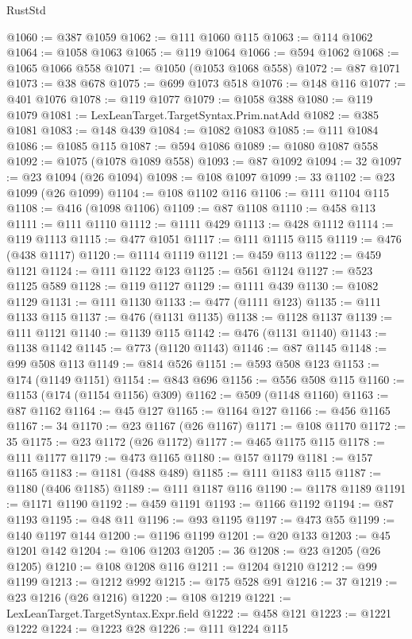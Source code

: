 \begin{lexlean}{RustStd}
\begin{coremodule}
@1060 := @387 @1059
@1062 := @111 @1060 @115
@1063 := @114 @1062
@1064 := @1058 @1063
@1065 := @119 @1064
@1066 := @594 @1062
@1068 := @1065 @1066 @558
@1071 := @1050 (@1053 @1068 @558)
@1072 := @87 @1071
@1073 := @38 @678
@1075 := @699 @1073 @518
@1076 := @148 @116
@1077 := @401 @1076
@1078 := @119 @1077
@1079 := @1058 @388
@1080 := @119 @1079
@1081 := LexLeanTarget.TargetSyntax.Prim.natAdd
@1082 := @385 @1081
@1083 := @148 @439
@1084 := @1082 @1083
@1085 := @111 @1084
@1086 := @1085 @115
@1087 := @594 @1086
@1089 := @1080 @1087 @558
@1092 := @1075 (@1078 @1089 @558)
@1093 := @87 @1092
@1094 := 32
@1097 := @23 @1094 (@26 @1094)
@1098 := @108 @1097
@1099 := 33
@1102 := @23 @1099 (@26 @1099)
@1104 := @108 @1102 @116
@1106 := @111 @1104 @115
@1108 := @416 (@1098 @1106)
@1109 := @87 @1108
@1110 := @458 @113
@1111 := @111 @1110
@1112 := @1111 @429
@1113 := @428 @1112
@1114 := @119 @1113
@1115 := @477 @1051
@1117 := @111 @1115 @115
@1119 := @476 (@438 @1117)
@1120 := @1114 @1119
@1121 := @459 @113
@1122 := @459 @1121
@1124 := @111 @1122 @123
@1125 := @561 @1124
@1127 := @523 @1125 @589
@1128 := @119 @1127
@1129 := @1111 @439
@1130 := @1082 @1129
@1131 := @111 @1130
@1133 := @477 (@1111 @123)
@1135 := @111 @1133 @115
@1137 := @476 (@1131 @1135)
@1138 := @1128 @1137
@1139 := @111 @1121
@1140 := @1139 @115
@1142 := @476 (@1131 @1140)
@1143 := @1138 @1142
@1145 := @773 (@1120 @1143)
@1146 := @87 @1145
@1148 := @99 @508 @113
@1149 := @814 @526
@1151 := @593 @508 @123
@1153 := @174 (@1149 @1151)
@1154 := @843 @696
@1156 := @556 @508 @115
@1160 := @1153 (@174 (@1154 @1156) @309)
@1162 := @509 (@1148 @1160)
@1163 := @87 @1162
@1164 := @45 @127
@1165 := @1164 @127
@1166 := @456 @1165
@1167 := 34
@1170 := @23 @1167 (@26 @1167)
@1171 := @108 @1170
@1172 := 35
@1175 := @23 @1172 (@26 @1172)
@1177 := @465 @1175 @115
@1178 := @111 @1177
@1179 := @473 @1165
@1180 := @157 @1179
@1181 := @157 @1165
@1183 := @1181 (@488 @489)
@1185 := @111 @1183 @115
@1187 := @1180 (@406 @1185)
@1189 := @111 @1187 @116
@1190 := @1178 @1189
@1191 := @1171 @1190
@1192 := @459 @1191
@1193 := @1166 @1192
@1194 := @87 @1193
@1195 := @48 @11
@1196 := @93 @1195
@1197 := @473 @55
@1199 := @140 @1197 @144
@1200 := @1196 @1199
@1201 := @20 @133
@1203 := @45 @1201 @142
@1204 := @106 @1203
@1205 := 36
@1208 := @23 @1205 (@26 @1205)
@1210 := @108 @1208 @116
@1211 := @1204 @1210
@1212 := @99 @1199
@1213 := @1212 @992
@1215 := @175 @528 @91
@1216 := 37
@1219 := @23 @1216 (@26 @1216)
@1220 := @108 @1219
@1221 := LexLeanTarget.TargetSyntax.Expr.field
@1222 := @458 @121
@1223 := @1221 @1222
@1224 := @1223 @28
@1226 := @111 @1224 @115

\end{coremodule}
\end{lexlean}
